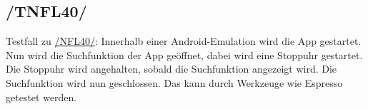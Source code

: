 \subsection*{/TNFL40/}

\label{/TNFL40/} Testfall zu \hyperref[/NFL40/]{/NFL40/}: Innerhalb einer \Gls{Android}-\Gls{Emulation} wird die App gestartet.
Nun wird die Suchfunktion der App geöffnet, dabei wird eine Stoppuhr gestartet.
Die Stoppuhr wird angehalten, sobald die Suchfunktion angezeigt wird.
Die Suchfunktion wird nun geschlossen.
Das kann durch Werkzeuge wie \Gls{Espresso} getestet werden.